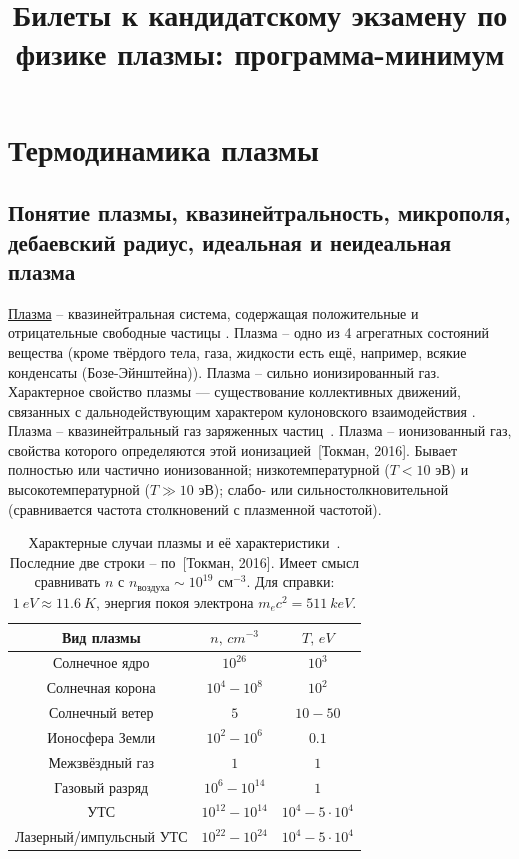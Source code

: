 \documentclass[10pt, a4paper]{article}
\title{Билеты к кандидатскому экзамену по физике плазмы: программа-минимум}
\date{}
\newcommand{\Tokman}{~[Токман, 2016]}
\let\stdsection\section
\renewcommand\section{\newpage\stdsection}
\begin{document}
\maketitle

\section{Термодинамика плазмы}

\subsection{Понятие плазмы, квазинейтральность, микрополя, дебаевский радиус, идеальная и неидеальная плазма}

\uline{Плазма} -- квазинейтральная система, содержащая положительные и отрицательные свободные частицы \cite{frank}. Плазма -- одно из 4 агрегатных состояний вещества (кроме твёрдого тела, газа, жидкости есть ещё, например, всякие конденсаты (Бозе-Эйнштейна)). Плазма -- сильно ионизированный газ. Характерное свойство плазмы — существование коллективных
движений, связанных с дальнодействующим характером кулоновского взаимодействия \cite{kroll}. Плазма -- квазинейтральный газ заряженных частиц~\cite{kotelnikov}. Плазма -- ионизованный газ, свойства которого определяются этой ионизацией\Tokman. Бывает полностью или частично ионизованной; низкотемпературной ($T<10$ эВ) и высокотемпературной ($T\gg10$ эВ); слабо- или сильностолкновительной (сравнивается частота столкновений с плазменной частотой).

\begin{table}[h!]
	\caption{Характерные случаи плазмы и её характеристики~\cite{kotelnikov}. \linebreak Последние две строки -- по\Tokman. Имеет смысл сравнивать $n$ с $n_\text{воздуха} \sim 10^{19}$ см$^{-3}$.	Для справки: $1\ eV \approx 11.6\ K$, энергия покоя электрона $m_e c^2 = 511\ keV$.}
	\label{tabular:typical_plasma}
	\begin{center}
		\begin{tabular}{|c|c|c|}
			\hline
			Вид плазмы & $n,\,cm^{-3}$ & $T,\,eV$ \\ \hline
			Солнечное ядро & $10^{26}$ & $10^3$ \\
			Солнечная корона & $10^4-10^8$ & $10^2$ \\
			Солнечный ветер & $5$ & $10-50$ \\
			Ионосфера Земли & $10^2-10^6$ & $0.1$ \\
			Межзвёздный газ & $1$ & $1$ \\
			Газовый разряд & $10^{6}-10^{14}$ & $1$ \\
			УТС & $10^{12}-10^{14}$ & $10^4-5\cdot10^4$ \\
			Лазерный/импульсный УТС & $10^{22}-10^{24}$ & $10^4-5\cdot10^4$ \\
			\hline
		\end{tabular}
	\end{center}
\end{table}
\end{document}
